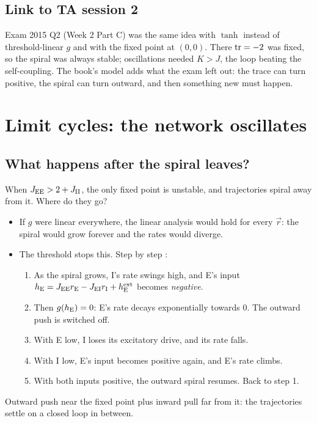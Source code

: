 \subsection{Link to TA session 2}

Exam 2015 Q2 (Week 2 Part C) was the same idea with $\tanh$ instead of threshold-linear $g$ and with the fixed point at $(0,0)$. There $\operatorname{tr}=-2$ was fixed, so the spiral was always stable; oscillations needed $K>J$, the loop beating the self-coupling.
The book's model adds what the exam left out: the trace can turn positive, the spiral can turn outward, and then something new must happen.

\section{Limit cycles: the network oscillates}\label{sec:limitcycle}

\subsection{What happens after the spiral leaves?}

When $J_{\mathrm{E}\mathrm{E}}>2+J_{\mathrm{I}\mathrm{I}}$, the only fixed point is unstable, and trajectories spiral away from it. Where do they go?
\begin{itemize}
  \item If $g$ were linear everywhere, the linear analysis would hold for every $\vec r$: the spiral would grow forever and the rates would diverge.
  \item The threshold stops this. Step by step :
  \begin{enumerate}
    \item As the spiral grows, I's rate swings high, and E's input $h_{\mathrm{E}}=J_{\mathrm{E}\mathrm{E}}r_{\mathrm{E}}-J_{\mathrm{E}\mathrm{I}}r_{\mathrm{I}}+h_{\mathrm{E}}^{\text{ext}}$ becomes \emph{negative}.
    \item Then $g(h_{\mathrm{E}})=0$: E's rate decays exponentially towards $0$. The outward push is switched off.
    \item With E low, I loses its excitatory drive, and its rate falls.
    \item With I low, E's input becomes positive again, and E's rate climbs.
    \item With both inputs positive, the outward spiral resumes. Back to step 1.
  \end{enumerate}
\end{itemize}
Outward push near the fixed point plus inward pull far from it: the trajectories settle on a closed loop in between.

